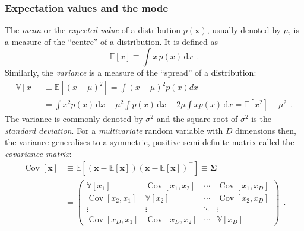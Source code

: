 \documentclass[12pt,dvipsnames]{report}
\newcommand{\ud}{\,\mathrm{d}}
\renewcommand{\vec}[1]{\boldsymbol{\mathbf{#1}}}
\newcommand{\hquad}{~~}
\begin{document}
\subsubsection{Expectation values and the mode}
The \emph{mean} or the \emph{expected value} of a distribution $p(\vec{x})$,
usually denoted by $\mu$, is a measure of the ``centre'' of a distribution.
It is defined as
\begin{equation}
    \mathbb{E}[x] \equiv\int x \,p(x) \ud x
    \hquad.
\end{equation}
Similarly, the \emph{variance} is a measure of the ``spread'' of a distribution:
\begin{align}
    \mathbb{V}[x] & \equiv\mathbb{E}\left[(x-\mu)^{2}\right]=\int(x-\mu)^{2} p(x) d x                                           \\
                  & =\int x^{2} p(x) \ud x+\mu^{2} \int p(x) \ud x-2 \mu \int x p(x) \ud x=\mathbb{E}\left[x^{2}\right]-\mu^{2}
                  \hquad.
\end{align}
The variance is commonly denoted by $\sigma^2$ and the square root of $\sigma^2$ is the
\emph{standard deviation}.
For a \emph{multivariate} random variable with $D$ dimensions then, the variance generalises to
a symmetric, positive semi-definite matrix called the \emph{covariance matrix}:
\begin{align}
    \operatorname{Cov}[\vec{x}] & \equiv\mathbb{E}\left[(\vec{x}-\mathbb{E}[\vec{x}])(\vec{x}-\mathbb{E}[\vec{x}])^{\intercal}\right] \equiv \boldsymbol{\Sigma}                                                                                                                                                                           \\
                                & =\left(\begin{array}{cccc}
                                             \mathbb{V}\left[x_{1}\right]                & \operatorname{Cov}\left[x_{1}, x_{2}\right] & \cdots & \operatorname{Cov}\left[x_{1}, x_{D}\right] \\
                                             \operatorname{Cov}\left[x_{2}, x_{1}\right] & \mathbb{V}\left[x_{2}\right]                & \cdots & \operatorname{Cov}\left[x_{2}, x_{D}\right] \\
                                             \vdots                                      & \vdots                                      & \ddots & \vdots                                      \\
                                             \operatorname{Cov}\left[x_{D}, x_{1}\right] & \operatorname{Cov}\left[x_{D}, x_{2}\right] & \cdots & \mathbb{V}\left[x_{D}\right]
                                         \end{array}\right)
                                         \hquad.
\end{align}
\end{document}
